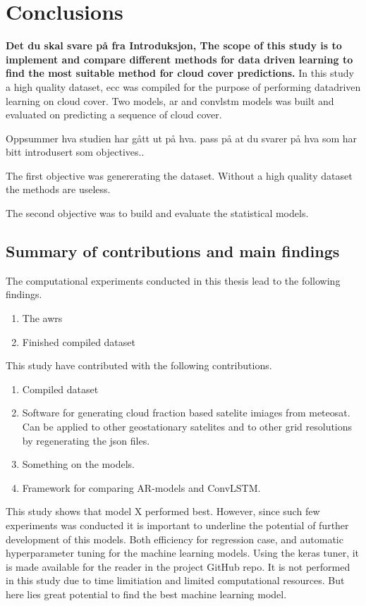 \chapter{Conclusions}
\textbf{Det du skal svare på fra Introduksjon, The scope of this study is to implement and compare different methods for data driven learning to find the most suitable method for cloud cover predictions. }
In this study a high quality dataset, \acrfull{ecc} was compiled for the purpose of performing datadriven learning on cloud cover. Two models, \acrfull{ar} and \acrlong{convlstm} models was built and evaluated on predicting a sequence of cloud cover.

Oppsummer hva studien har gått ut på hva. pass på at du svarer på hva som har bitt introdusert som objectives..

The first objective was genererating the dataset. Without a high quality dataset the methods are useless. 

The second objective was to build and evaluate the statistical models. 

\section{Summary of contributions and main findings }
The computational experiments conducted in this thesis lead to the following findings. 
\begin{enumerate}
    \item The \acrfull{awrs}
    \item Finished compiled dataset
\end{enumerate}

This study have contributed with the following contributions.
\begin{enumerate}
    \item Compiled dataset 
    \item Software for generating cloud fraction based satelite imiages from meteosat. Can be applied to other geostationary satelites and to other grid resolutions by regenerating the json files.
    \item Something on the models. 
    \item Framework for comparing AR-models and ConvLSTM.
\end{enumerate}

This study shows that model X performed best. However, since such few experiments was conducted it is important to underline the potential of further development of this models. Both efficiency for regression case, and automatic hyperparameter tuning for the machine learning models. Using the keras tuner, it is made available for the reader in the project GitHub repo. It is not performed in this study due to time limitiation and limited computational resources. But here lies great potential to find the best machine learning model. 

